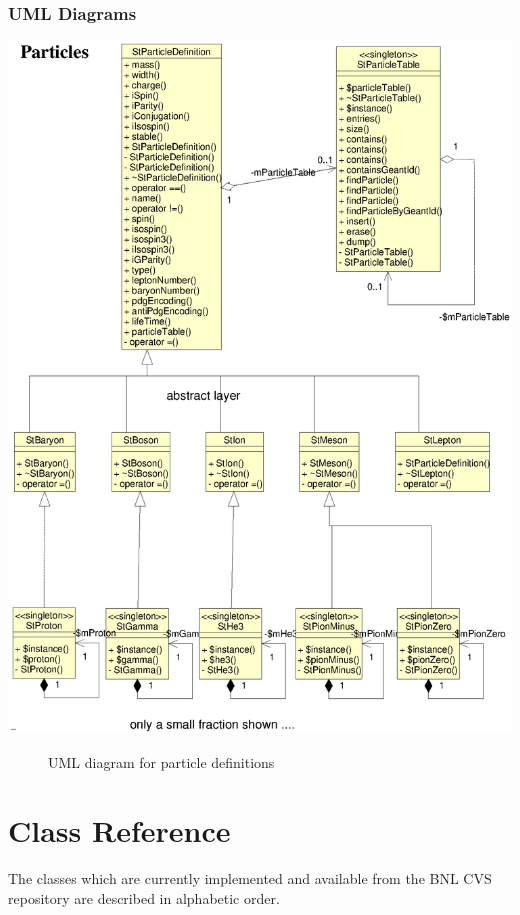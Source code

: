 \documentclass[twoside]{article}
\begin{document}
\begin{description}
\subsubsection{UML Diagrams}
\label{sec:umlPart}
\begin{center}
    \includegraphics[height=0.85\textheight]{umlParticles.eps}
\end{center}
\begin{figure}[h]    
    \caption{UML diagram for particle definitions}
    \label{fig:umlPart}
\end{figure}

\clearpage


  
\section{Class Reference}
The classes which are currently implemented and available from the
BNL CVS repository are described in alphabetic order.
\clearpage


\end{description}
\end{document}

